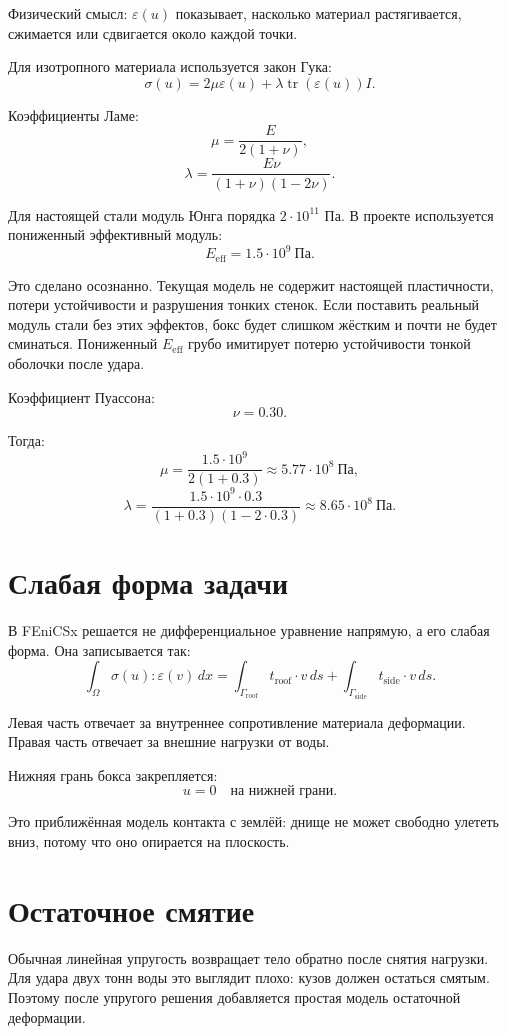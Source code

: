 \documentclass[12pt,a4paper]{article}
\begin{document}
Физический смысл: \(\varepsilon(u)\) показывает, насколько материал растягивается,
сжимается или сдвигается около каждой точки.

Для изотропного материала используется закон Гука:
\[
\sigma(u)=2\mu\varepsilon(u)+\lambda \operatorname{tr}(\varepsilon(u))I.
\]

Коэффициенты Ламе:
\[
\mu=\frac{E}{2(1+\nu)},
\]
\[
\lambda=\frac{E\nu}{(1+\nu)(1-2\nu)}.
\]

Для настоящей стали модуль Юнга порядка \(2\cdot 10^{11}\) Па. В проекте
используется пониженный эффективный модуль:
\[
E_{\text{eff}} = 1.5\cdot 10^9 \ \text{Па}.
\]

Это сделано осознанно. Текущая модель не содержит настоящей пластичности,
потери устойчивости и разрушения тонких стенок. Если поставить реальный модуль
стали без этих эффектов, бокс будет слишком жёстким и почти не будет сминаться.
Пониженный \(E_{\text{eff}}\) грубо имитирует потерю устойчивости тонкой
оболочки после удара.

Коэффициент Пуассона:
\[
\nu = 0.30.
\]

Тогда:
\[
\mu =
\frac{1.5\cdot 10^9}{2(1+0.3)}
\approx 5.77\cdot 10^8 \ \text{Па},
\]
\[
\lambda =
\frac{1.5\cdot 10^9\cdot 0.3}{(1+0.3)(1-2\cdot 0.3)}
\approx 8.65\cdot 10^8 \ \text{Па}.
\]

\section{Слабая форма задачи}

В FEniCSx решается не дифференциальное уравнение напрямую, а его слабая форма.
Она записывается так:
\[
\int_{\Omega}\sigma(u):\varepsilon(v)\,dx
=
\int_{\Gamma_{\text{roof}}} t_{\text{roof}}\cdot v\,ds
+
\int_{\Gamma_{\text{side}}} t_{\text{side}}\cdot v\,ds.
\]

Левая часть отвечает за внутреннее сопротивление материала деформации.
Правая часть отвечает за внешние нагрузки от воды.

Нижняя грань бокса закрепляется:
\[
u=0 \quad \text{на нижней грани}.
\]

Это приближённая модель контакта с землёй: днище не может свободно улететь вниз,
потому что оно опирается на плоскость.

\section{Остаточное смятие}

Обычная линейная упругость возвращает тело обратно после снятия нагрузки. Для
удара двух тонн воды это выглядит плохо: кузов должен остаться смятым. Поэтому
после упругого решения добавляется простая модель остаточной деформации.
\end{document}

